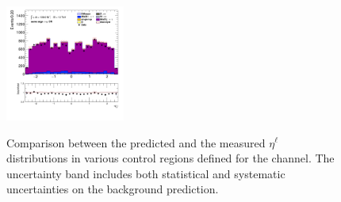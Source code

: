 \begin{figure}[!htp]
\begin{center}
			\includegraphics[width=0.35\textwidth]{chapters/chapter6_HPlus/images/taulep/lep_0_eta_SS_TAUMU.png} \\
			\end{center}
			\caption{
			Comparison between the predicted and the measured $\eta^{\ell}$ distributions in various control regions defined for the \taulep channel. The uncertainty band includes both statistical and systematic uncertainties on the background prediction. 
			}
			\label{fig:bkg-eta-lep-taulep}
		\end{figure}

